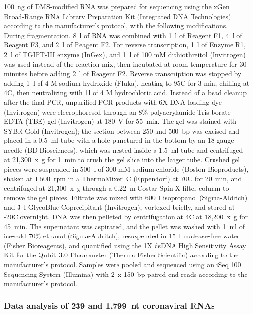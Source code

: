 \documentclass[main.tex]{subfiles}
\begin{document}
100~ng of DMS-modified RNA was prepared for sequencing using the xGen Broad-Range RNA Library Preparation Kit (Integrated DNA Technologies) according to the manufacturer’s protocol, with the following modifications.
During fragmentation, 8~\textmu l of RNA was combined with 1~\textmu l of Reagent F1, 4~\textmu l of Reagent F3, and 2~\textmu l of Reagent F2. 
For reverse transcription, 1~\textmu l of Enzyme R1, 2~\textmu l of TGIRT-III enzyme (InGex), and 1~\textmu l of 100 mM dithiothreitol (Invitrogen) was used instead of the reaction mix, then incubated at room temperature for 30 minutes before adding 2~\textmu l of Reagent F2.
Reverse transcription was stopped by adding 1~\textmu l of 4 M sodium hydroxide (Fluka), heating to 95\textdegree C for 3 min, chilling at 4\textdegree C, then neutralizing with 1\textmu l of 4 M hydrochloric acid.
Instead of a bead cleanup after the final PCR, unpurified PCR products with 6X DNA loading dye (Invitrogen) were elecrophoresed through an 8\% polyacrylamide Tris-borate-EDTA (TBE) gel (Invitrogen) at 180~V for 55~min.
The gel was stained with SYBR Gold (Invitrogen); the section between 250 and 500~bp was excised and placed in a 0.5~ml tube with a hole punctured in the bottom by an 18-gauge needle (BD Biosciences), which was nested inside a 1.5~ml tube and centrifuged at 21,300~x~g for 1~min to crush the gel slice into the larger tube.
Crushed gel pieces were suspended in 500~\textmu l of 300 mM sodium chloride (Boston Bioproducts), shaken at 1,500~rpm in a ThermoMixer~C (Eppendorf) at 70\textdegree C for 20~min, and centrifuged at 21,300~x~g through a 0.22~\textmu m Costar Spin-X filter column to remove the gel pieces.
Filtrate was mixed with 600~\textmu l isopropanol (Sigma-Aldrich) and 3~\textmu l GlycoBlue Coprecipitant (Invitrogen), vortexed briefly, and stored at -20\textdegree C overnight.
DNA was then pelleted by centrifugation at 4\textdegree C at 18,200~x~g for 45~min.
The supernatant was aspirated, and the pellet was washed with 1~ml of ice-cold 70\% ethanol (Sigma-Aldritch), resuspended in 15~\textmu l nuclease-free water (Fisher Bioreagents), and quantified using the 1X dsDNA High Sensitivity Assay Kit for the Qubit~3.0 Fluorometer (Thermo Fisher Scientific) according to the manufacturer's protocol.
Samples were pooled and sequenced using an iSeq 100 Sequencing System (Illumina) with 2~x 150~bp paired-end reads according to the manufacturer's protocol.

\subsubsection{Data analysis of 239 and 1,799~nt coronaviral RNAs}
\end{document}
